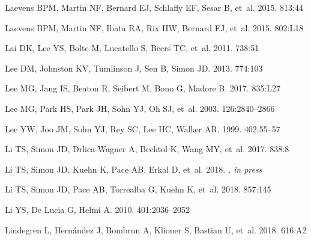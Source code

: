 \documentclass[a4paper]{ar-1col}
\begin{document}
\begin{thebibliography}{}
{Laevens} BPM, {Martin} NF, {Bernard} EJ, {Schlafly} EF, {Sesar} B, et~al.
  2015{}.
\textit{\apj} 813:44

{Laevens} BPM, {Martin} NF, {Ibata} RA, {Rix} HW, {Bernard} EJ, et~al.
  2015{}.
\textit{\apjl} 802:L18

{Lai} DK, {Lee} YS, {Bolte} M, {Lucatello} S, {Beers} TC, et~al. 2011.
\textit{\apj} 738:51

{Lee} DM, {Johnston} KV, {Tumlinson} J, {Sen} B, {Simon} JD. 2013.
\textit{\apj} 774:103

{Lee} MG, {Jang} IS, {Beaton} R, {Seibert} M, {Bono} G, {Madore} B. 2017.
\textit{\apjl} 835:L27

{Lee} MG, {Park} HS, {Park} JH, {Sohn} YJ, {Oh} SJ, et~al. 2003.
\textit{\aj} 126:2840--2866

{Lee} YW, {Joo} JM, {Sohn} YJ, {Rey} SC, {Lee} HC, {Walker} AR. 1999.
\textit{\nat} 402:55--57

{Li} TS, {Simon} JD, {Drlica-Wagner} A, {Bechtol} K, {Wang} MY, et~al. 2017.
\textit{\apj} 838:8

{Li} TS, {Simon} JD, {Kuehn} K, {Pace} AB, {Erkal} D, et~al.
  2018{}.
\textit{\apj, in press}

{Li} TS, {Simon} JD, {Pace} AB, {Torrealba} G, {Kuehn} K, et~al.
  2018{}.
\textit{\apj} 857:145

{Li} YS, {De Lucia} G, {Helmi} A. 2010.
\textit{\mnras} 401:2036--2052

{Lindegren} L, {Hern{\'a}ndez} J, {Bombrun} A, {Klioner} S, {Bastian} U, et~al.
  2018.
\textit{\aap} 616:A2


\end{thebibliography}
\end{document}
